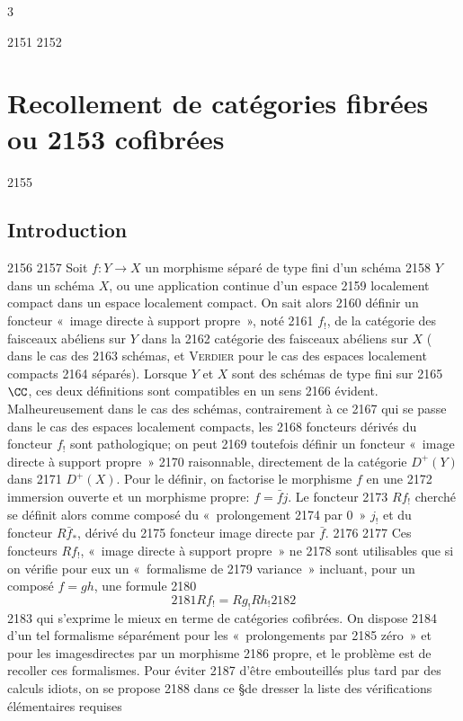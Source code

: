 3	\documentclass[10pt]{../fichiers-configuration-latex/smfart}
\begin{document}
  2151	
  2152	\section{Recollement de catégories fibrées ou
  2153	  cofibrées}	
  2155	\subsection{Introduction}
  2156	
  2157	Soit $f:Y\rightarrow X$ un morphisme séparé de type fini d'un schéma
  2158	$Y$ dans un schéma $X$, ou une application continue d'un espace
  2159	localement compact dans un espace localement compact. On sait alors
  2160	définir un foncteur « image directe à support propre », noté
  2161	$f_{!}$, de la catégorie des faisceaux abéliens sur $Y$ dans la
  2162	catégorie des faisceaux abéliens sur $X$ (\cf {} dans le cas des
  2163	schémas, et \textsc{Verdier} \cite{V3} pour le cas des espaces localement compacts
  2164	séparés). Lorsque $Y$ et $X$ sont des schémas de type fini sur
  2165	$\CC$, ces deux définitions sont compatibles en un sens
  2166	évident. Malheureusement dans le cas des schémas, contrairement à ce
  2167	qui se passe dans le cas des espaces localement compacts, les
  2168	foncteurs dérivés du foncteur $f_{!}$ sont pathologique; on peut
  2169	toutefois définir un foncteur « image directe à support propre »
  2170	raisonnable, directement de la catégorie $D^{+}(Y)$ dans
  2171	$D^{+}(X)$. Pour le définir, on factorise le morphisme $f$ en une
  2172	immersion ouverte et un morphisme propre: $f=\bar{f}j$. Le foncteur
  2173	$Rf_{!}$ cherché se définit alors comme composé du « prolongement
  2174	par $0$ »  $j_{!}$ et du foncteur $R\bar{f}_{\ast}$, dérivé du
  2175	foncteur image directe par $\bar{f}$.
  2176	
  2177	Ces foncteurs $Rf_{!}$, « image directe à support propre »  ne
  2178	sont utilisables que si on vérifie pour eux un « formalisme de
  2179	variance »  incluant, pour un composé $f=gh$, une formule
  2180	\[
  2181	Rf_{!}=Rg_{!} Rh_{!}
  2182	\]
  2183	qui s'exprime le mieux en terme de catégories cofibrées. On dispose
  2184	d'un tel formalisme séparément pour les « prolongements par
  2185	zéro » et pour les images\pageoriginale directes par un morphisme
  2186	propre, et le problème est de recoller ces formalismes. Pour éviter
  2187	d'être embouteillés plus tard par des calculs idiots, on se propose
  2188	dans ce \S de dresser la liste des vérifications élémentaires requises
\end{document}
